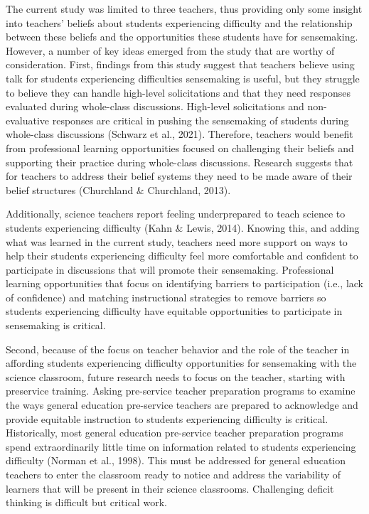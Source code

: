 \documentclass{sig-alternate} %
\begin{document}
\begin{large}
The current study was limited to three teachers, thus providing only some insight into teachers’ beliefs about students experiencing difficulty and the relationship between these beliefs and the opportunities these students have for sensemaking. However, a number of key ideas emerged from the study that are worthy of consideration. First, findings from this study suggest that teachers believe using talk for students experiencing difficulties sensemaking is useful, but they struggle to believe they can handle high-level solicitations and that they need responses evaluated during whole-class discussions. High-level solicitations and non-evaluative responses are critical in pushing the sensemaking of students during whole-class discussions (Schwarz et al., 2021). Therefore, teachers would benefit from professional learning opportunities focused on challenging their beliefs and supporting their practice during whole-class discussions. Research suggests that for teachers to address their belief systems they need to be made aware of their belief structures (Churchland \& Churchland, 2013).

Additionally, science teachers report feeling underprepared to teach science to students experiencing difficulty (Kahn \& Lewis, 2014). Knowing this, and adding what was learned in the current study, teachers need more support on ways to help their students experiencing difficulty feel more comfortable and confident to participate in discussions that will promote their sensemaking. Professional learning opportunities that focus on identifying barriers to participation (i.e., lack of confidence) and matching instructional strategies to remove barriers so students experiencing difficulty have equitable opportunities to participate in sensemaking is critical. 

Second, because of the focus on teacher behavior and the role of the teacher in affording students experiencing difficulty opportunities for sensemaking with the science classroom, future research needs to focus on the teacher, starting with preservice training. Asking pre-service teacher preparation programs to examine the ways general education pre-service teachers are prepared to acknowledge and provide equitable instruction to students experiencing difficulty is critical. Historically, most general education pre-service teacher preparation programs spend extraordinarily little time on information related to students experiencing difficulty (Norman et al., 1998). This must be addressed for general education teachers to enter the classroom ready to notice and address the variability of learners that will be present in their science classrooms. Challenging deficit thinking is difficult but critical work. 


\end{large}
\end{document}
